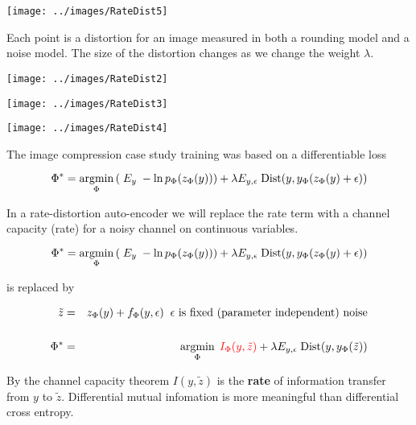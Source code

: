 {

\centerline{\texttt{[image: ../images/RateDist5]}}

Each point is a distortion for an image measured in both a rounding model and a noise model.  The size of the distortion changes as we change the weight $\lambda$.


\bigskip
\centerline{\texttt{[image: ../images/RateDist2]}}


\bigskip
\centerline{\texttt{[image: ../images/RateDist3]}}


\bigskip
\centerline{\texttt{[image: ../images/RateDist4]}}


The image compression case study training was based on a differentiable loss

\vfill
$$\Phi^* = \operatorname*{argmin}_\Phi \left(\; E_y\;- \ln p_\Phi(z_\Phi(y))\right) + \lambda E_{y,\epsilon}\; \mathrm{Dist}(y,y_\Phi(z_\Phi(y) + \epsilon))$$

\vfill
In a rate-distortion auto-encoder we will replace the rate term with a channel capacity (rate) for a noisy channel on continuous variables.


$$\Phi^* = \operatorname*{argmin}_\Phi \left(\; E_y\;- \ln p_\Phi(z_\Phi(y))\right) + \lambda E_{y,\epsilon}\; \mathrm{Dist}(y,y_\Phi(z_\Phi(y) + \epsilon))$$

\vfill
is replaced by

\begin{eqnarray*}
\tilde{z} & = & z_\Phi(y) + f_\Phi(y,\epsilon) \;\;\mbox{$\epsilon$ is fixed (parameter independent) noise} \\
\\
\Phi^* & = & \operatorname*{argmin}_\Phi \;{\color{red} I_\Phi(y,\tilde{z})} + \lambda E_{y,\epsilon}\; \mathrm{Dist}(y,y_\Phi(\tilde{z}))
\end{eqnarray*}

\vfill
By the channel capacity theorem {\color{red} $I(y,\tilde{z})$} is the {\bf rate} of information transfer from $y$ to $\tilde{z}$.
Differential mutual infomation is more meaningful than differential cross entropy.

}
